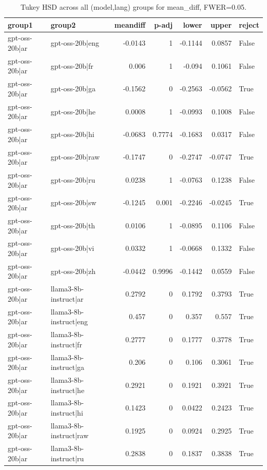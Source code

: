 \begin{table}
\caption{Tukey HSD across all (model,lang) groups for mean_diff, FWER=0.05.}
\label{tab:tukey_all_models_all_langs_mean_diff}
\begin{tabular}{l l r r r r l}
\toprule
group1 & group2 & meandiff & p-adj & lower & upper & reject \\
\midrule
gpt-oss-20b|ar & gpt-oss-20b|eng & -0.0143 & 1 & -0.1144 & 0.0857 & False \\
gpt-oss-20b|ar & gpt-oss-20b|fr & 0.006 & 1 & -0.094 & 0.1061 & False \\
gpt-oss-20b|ar & gpt-oss-20b|ga & -0.1562 & 0 & -0.2563 & -0.0562 & True \\
gpt-oss-20b|ar & gpt-oss-20b|he & 0.0008 & 1 & -0.0993 & 0.1008 & False \\
gpt-oss-20b|ar & gpt-oss-20b|hi & -0.0683 & 0.7774 & -0.1683 & 0.0317 & False \\
gpt-oss-20b|ar & gpt-oss-20b|raw & -0.1747 & 0 & -0.2747 & -0.0747 & True \\
gpt-oss-20b|ar & gpt-oss-20b|ru & 0.0238 & 1 & -0.0763 & 0.1238 & False \\
gpt-oss-20b|ar & gpt-oss-20b|sw & -0.1245 & 0.001 & -0.2246 & -0.0245 & True \\
gpt-oss-20b|ar & gpt-oss-20b|th & 0.0106 & 1 & -0.0895 & 0.1106 & False \\
gpt-oss-20b|ar & gpt-oss-20b|vi & 0.0332 & 1 & -0.0668 & 0.1332 & False \\
gpt-oss-20b|ar & gpt-oss-20b|zh & -0.0442 & 0.9996 & -0.1442 & 0.0559 & False \\
gpt-oss-20b|ar & llama3-8b-instruct|ar & 0.2792 & 0 & 0.1792 & 0.3793 & True \\
gpt-oss-20b|ar & llama3-8b-instruct|eng & 0.457 & 0 & 0.357 & 0.557 & True \\
gpt-oss-20b|ar & llama3-8b-instruct|fr & 0.2777 & 0 & 0.1777 & 0.3778 & True \\
gpt-oss-20b|ar & llama3-8b-instruct|ga & 0.206 & 0 & 0.106 & 0.3061 & True \\
gpt-oss-20b|ar & llama3-8b-instruct|he & 0.2921 & 0 & 0.1921 & 0.3921 & True \\
gpt-oss-20b|ar & llama3-8b-instruct|hi & 0.1423 & 0 & 0.0422 & 0.2423 & True \\
gpt-oss-20b|ar & llama3-8b-instruct|raw & 0.1925 & 0 & 0.0924 & 0.2925 & True \\
gpt-oss-20b|ar & llama3-8b-instruct|ru & 0.2838 & 0 & 0.1837 & 0.3838 & True \\

\end{tabular}
\end{table}
